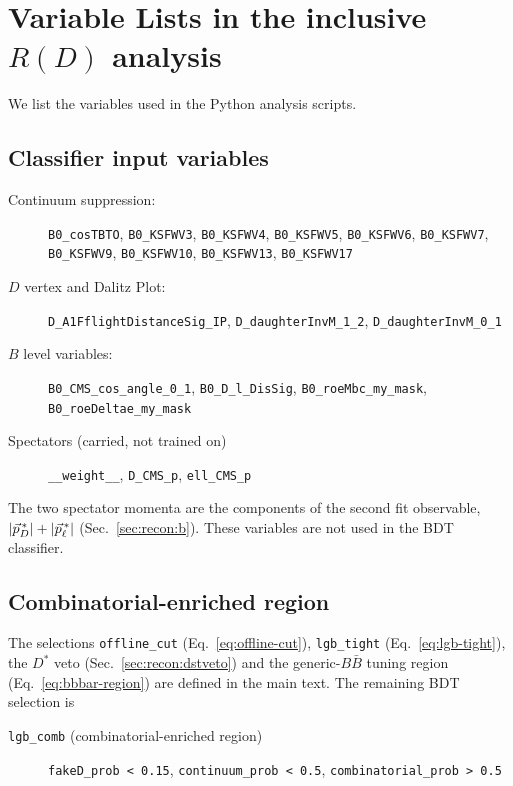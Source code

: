 \section{Variable Lists in the inclusive $R(D)$ analysis}
\label{app:selections}

We list the variables used in the Python analysis scripts.

\subsection{Classifier input variables}
\label{app:selections:mva}

\begin{description}
  \item[Continuum suppression:]
    \texttt{B0\_cosTBTO}, \texttt{B0\_KSFWV3}, \texttt{B0\_KSFWV4},
    \texttt{B0\_KSFWV5}, \texttt{B0\_KSFWV6}, \texttt{B0\_KSFWV7},
    \texttt{B0\_KSFWV9}, \texttt{B0\_KSFWV10}, \texttt{B0\_KSFWV13},
    \texttt{B0\_KSFWV17}
  \item[$D$ vertex and Dalitz Plot:]
    \texttt{D\_A1FflightDistanceSig\_IP}, \texttt{D\_daughterInvM\_1\_2},
    \texttt{D\_daughterInvM\_0\_1}
  \item[$B$ level variables:]
    \texttt{B0\_CMS\_cos\_angle\_0\_1}, \texttt{B0\_D\_l\_DisSig},
    \texttt{B0\_roeMbc\_my\_mask}, \texttt{B0\_roeDeltae\_my\_mask}
  \item[Spectators (carried, not trained on)]
    \texttt{\_\_weight\_\_}, \texttt{D\_CMS\_p}, \texttt{ell\_CMS\_p}
\end{description}

The two spectator momenta are the components of the second fit observable,
$|\vec{p}^{\,*}_{D}| + |\vec{p}^{\,*}_{\ell}|$ (Sec.~\ref{sec:recon:b}). These variables are not used in the BDT classifier.

\subsection{Combinatorial-enriched region}
\label{app:selections:cuts}

The selections \texttt{offline\_cut} (Eq.~\eqref{eq:offline-cut}),
\texttt{lgb\_tight} (Eq.~\eqref{eq:lgb-tight}), the $D^{*}$ veto
(Sec.~\ref{sec:recon:dstveto}) and the generic-$B\bar{B}$ tuning region
(Eq.~\eqref{eq:bbbar-region}) are defined in the main text.
The remaining BDT selection is
\begin{description}
  \item[\texttt{lgb\_comb} (combinatorial-enriched region)]
    \texttt{fakeD\_prob < 0.15}, \texttt{continuum\_prob < 0.5},
    \texttt{combinatorial\_prob > 0.5}
\end{description}
